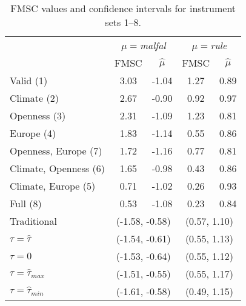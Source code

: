 \begin{table}[htbp]
\caption{FMSC values and confidence intervals for instrument sets 1--8.}
\label{tab:replicate}
\small
 \begin{center}
 \begin{tabular}{lcccc}\hline\hline
 & \multicolumn{2}{c}{$\mu=$\emph{malfal}}& \multicolumn{2}{c}{$\mu=$\emph{rule}}\\
&\multicolumn{1}{c}{FMSC}&\multicolumn{1}{c}{$\widehat{\mu}$}&\multicolumn{1}{c}{FMSC}&\multicolumn{1}{c}{$\widehat{\mu}$}\tabularnewline
\hline
Valid (1)&3.03&-1.04&1.27&0.89\tabularnewline
Climate (2)&2.67&-0.90&0.92&0.97\tabularnewline   
Openness (3)&2.31&-1.09&1.23&0.81\tabularnewline  
Europe (4)&1.83&-1.14&0.55&0.86\tabularnewline
Openness, Europe (7)&1.72&-1.16&0.77&0.81\tabularnewline  
Climate, Openness (6)&1.65&-0.98&0.43&0.86\tabularnewline
Climate, Europe (5)&0.71&-1.02&0.26&0.93\tabularnewline
Full (8)&0.53&-1.08&0.23&0.84\tabularnewline
\hline 
Traditional&\multicolumn{2}{c}{(-1.58, -0.58)}&\multicolumn{2}{c}{(0.57, 1.10)}\\
$\tau = \widehat{\tau}$&\multicolumn{2}{c}{(-1.54, -0.61)}&\multicolumn{2}{c}{(0.55, 1.13)}\\
$\tau = 0$&\multicolumn{2}{c}{(-1.53, -0.64)}&\multicolumn{2}{c}{(0.55, 1.12)}\\
$\tau = \widehat{\tau}_{max}$&\multicolumn{2}{c}{(-1.51, -0.55)}&\multicolumn{2}{c}{(0.55, 1.17)}\\
$\tau = \widehat{\tau}_{min}$&\multicolumn{2}{c}{(-1.61, -0.58)}&\multicolumn{2}{c}{(0.49, 1.15)}\\
\hline

\end{tabular}
\end{center}
\end{table}



